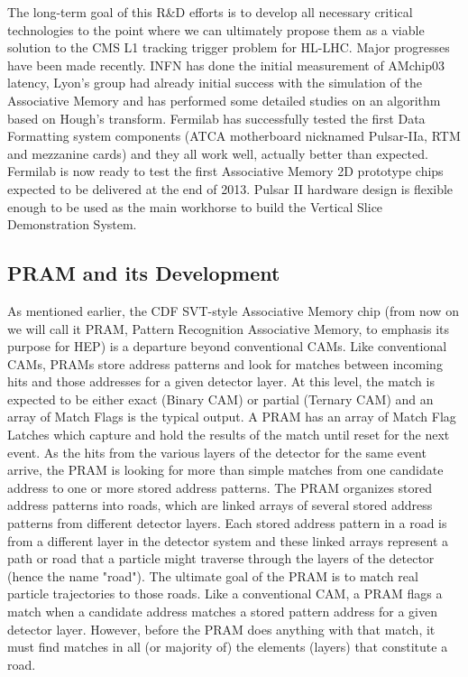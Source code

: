 \noindent The long-term goal of this R\&D efforts is to develop all necessary critical technologies to the point where we can ultimately propose them as a viable solution to the CMS L1 tracking trigger problem for HL-LHC. Major progresses have been made recently. INFN has done the initial measurement of AMchip03 latency, Lyon's group had already initial success with the simulation of the Associative Memory and has performed some detailed studies on an algorithm based on Hough's transform. Fermilab has successfully tested the first Data Formatting system components (ATCA motherboard nicknamed Pulsar-IIa, RTM and mezzanine cards) and they all work well, actually better than expected. Fermilab is now ready to test the first Associative Memory 2D prototype chips expected to be delivered at the end of 2013.  Pulsar II hardware design is flexible enough to be used as the main workhorse to build the Vertical Slice Demonstration System.

\subsection{PRAM and its Development}
  
\noindent As mentioned earlier, the CDF SVT-style Associative Memory chip (from now on we will call it PRAM, Pattern Recognition Associative Memory, to emphasis its purpose for HEP) is a departure beyond conventional CAMs. Like conventional CAMs, PRAMs store address patterns and look for matches between incoming hits and those addresses for a given detector layer. At this level, the match is expected to be either exact (Binary CAM) or partial (Ternary CAM) and an array of Match Flags is the typical output. A PRAM has an array of Match Flag Latches which capture and hold the results of the match until reset for the next event. As the hits from the various layers of the detector for the same event arrive, the PRAM is looking for more than simple matches from one candidate address to one or more stored address patterns. The PRAM organizes stored address patterns into roads, which are linked arrays of several stored address patterns from different detector layers. Each stored address pattern in a road is from a different layer in the detector system and these linked arrays represent a path or road that a particle might traverse through the layers of the detector (hence the name "road"). The ultimate goal of the PRAM is to match real particle trajectories to those roads. Like a conventional CAM, a PRAM flags a match when a candidate address matches a stored pattern address for a given detector layer. However, before the PRAM does anything with that match, it must find matches in all (or majority of) the elements (layers) that constitute a road.

